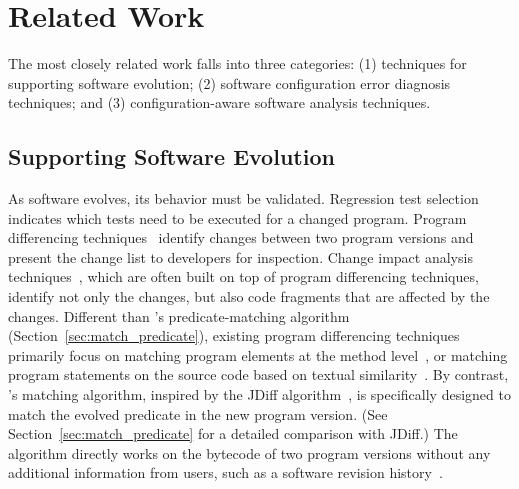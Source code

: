 \section{Related Work}
\label{sec:related}

The most closely related work falls into
three categories: (1) techniques for
supporting software evolution; (2) software
configuration error diagnosis techniques;
and (3) configuration-aware software analysis techniques.

\subsection{Supporting Software Evolution}

As software evolves, its behavior must be validated.
Regression test selection~\cite{regression}
indicates which tests need to be executed for a changed
program.  Program differencing techniques~\cite{Giroux:2006:DIF, Xing:2005:UAO, Thummalapenta:2010:ESM, Kim:2013, Jin:2012:BRF,Nguyen:2010:RBF,Dig:2006:ADR, Kamiya:2002:CMT, Dagenais:2008}
identify changes between two program versions
and present the change list to developers for inspection.
Change impact analysis techniques~\cite{STVR:STVR1475}, which
are often built on top of program differencing
techniques, identify not only the changes, but also
code fragments that are affected by the changes. 
Different than \ourtool's predicate-matching
algorithm (Section~\ref{sec:match_predicate}),
existing program differencing techniques primarily focus on matching
program elements at the method level~\cite{frameworkevolution,
Xing:2005:UAO, Kim:2013, Nguyen:2010:RBF,Dig:2006:ADR,
Kamiya:2002:CMT, Dagenais:2008, Zhang:2011ICSM},
or matching program statements on the source code based on
textual similarity~\cite{Horwitz:1990:IST}.
By contrast, \ourtool's matching algorithm, inspired by
the JDiff algorithm~\cite{Apiwattanapong:2004}, is specifically designed 
to match the evolved predicate in the new program version.
(See Section~\ref{sec:match_predicate} for a detailed
comparison with JDiff.)
The algorithm directly works on the bytecode of two program
versions without any additional information from users,
such as a software revision history~\cite{frameworkevolution}.


